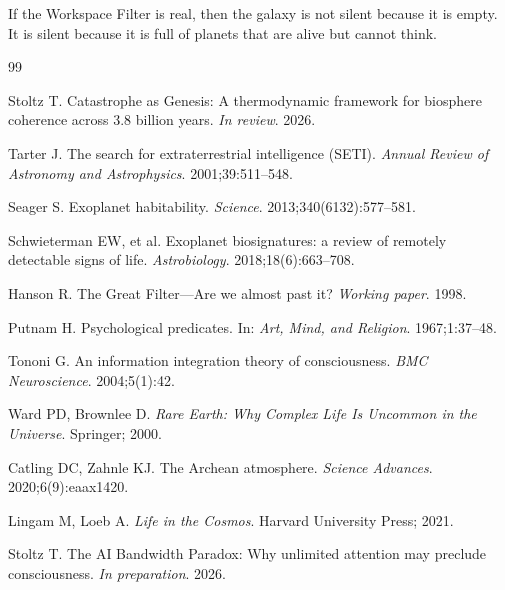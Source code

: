 \documentclass[10pt,letterpaper]{article}
\begin{document}
If the Workspace Filter is real, then the galaxy is not silent because
it is empty. It is silent because it is full of planets that are alive
but cannot think.

\begin{thebibliography}{99}

Stoltz T. Catastrophe as Genesis: A thermodynamic framework for biosphere
coherence across 3.8 billion years. \emph{In review}. 2026.

Tarter J. The search for extraterrestrial intelligence (SETI).
\emph{Annual Review of Astronomy and Astrophysics}. 2001;39:511--548.

Seager S. Exoplanet habitability.
\emph{Science}. 2013;340(6132):577--581.

Schwieterman EW, et al. Exoplanet biosignatures: a review of remotely
detectable signs of life. \emph{Astrobiology}. 2018;18(6):663--708.

Hanson R. The Great Filter---Are we almost past it?
\emph{Working paper}. 1998.

Putnam H. Psychological predicates. In: \emph{Art, Mind, and Religion}. 1967;1:37--48.

Tononi G. An information integration theory of consciousness.
\emph{BMC Neuroscience}. 2004;5(1):42.

Ward PD, Brownlee D. \emph{Rare Earth: Why Complex Life Is Uncommon in the Universe}.
Springer; 2000.

Catling DC, Zahnle KJ. The Archean atmosphere.
\emph{Science Advances}. 2020;6(9):eaax1420.

Lingam M, Loeb A. \emph{Life in the Cosmos}. Harvard University Press; 2021.

Stoltz T. The AI Bandwidth Paradox: Why unlimited attention may preclude
consciousness. \emph{In preparation}. 2026.

\end{thebibliography}
\end{document}
